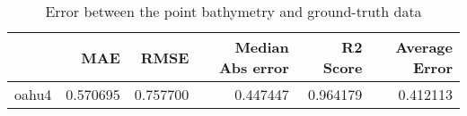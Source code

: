 \begin{table}[h!]
\caption{Error between the point bathymetry and ground-truth data}
\label{tab:oahu4_lidar_error}
\begin{tabular}{lrrrrr}
\toprule
 & MAE & RMSE & Median Abs error & R2 Score & Average Error \\
\midrule
oahu4 & 0.570695 & 0.757700 & 0.447447 & 0.964179 & 0.412113 \\
\bottomrule
\end{tabular}
\end{table}
